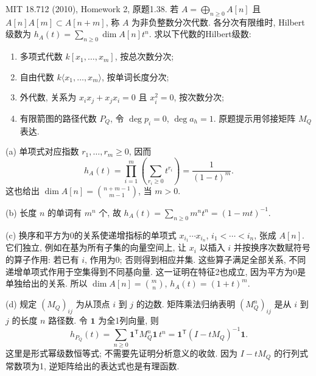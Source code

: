 \begin{exercise}\label{hw:1.38}
MIT 18.712 (2010), Homework 2, 原题1.38. 若 $A=\bigoplus_{n\ge0}A[n]$ 且 $A[n]A[m]\subset A[n+m]$, 称 $A$ 为非负整数分次代数. 各分次有限维时, Hilbert级数为 $h_A(t)=\sum_{n\ge0}\dim A[n]t^n$. 求以下代数的Hilbert级数:
\begin{enumerate}[label=(\alph*)]
\item 多项式代数 $k[x_1,\ldots,x_m]$, 按总次数分次;
\item 自由代数 $k\langle x_1,\ldots,x_m\rangle$, 按单词长度分次;
\item 外代数, 关系为 $x_ix_j+x_jx_i=0$ 且 $x_i^2=0$, 按次数分次;
\item 有限箭图的路径代数 $P_Q$, 令 $\deg p_i=0$, $\deg a_h=1$. 原题提示用邻接矩阵 $M_Q$ 表达.
\end{enumerate}
\end{exercise}
\begin{solution}
(a) 单项式对应指数 $r_1,\ldots,r_m\ge0$, 因而
\[
h_A(t)=\prod_{i=1}^m\left(\sum_{r_i\ge0}t^{r_i}\right)=\frac1{(1-t)^m}.
\]
这也给出 $\dim A[n]=\binom{n+m-1}{m-1}$, 当 $m>0$.

(b) 长度 $n$ 的单词有 $m^n$ 个, 故 $h_A(t)=\sum_{n\ge0}m^nt^n=(1-mt)^{-1}$.

(c) 换序和平方为0的关系使递增指标的单项式 $x_{i_1}\cdots x_{i_n}$, $i_1<\cdots<i_n$, 张成 $A[n]$. 它们独立, 例如在基为所有子集的向量空间上, 让 $x_i$ 以插入 $i$ 并按换序次数赋符号的算子作用: 若已有 $i$, 作用为0; 否则得到相应并集. 这些算子满足全部关系, 不同递增单项式作用于空集得到不同基向量. 这一证明在特征2也成立, 因为平方为0是单独给出的关系. 所以 $\dim A[n]=\binom mn$, $h_A(t)=(1+t)^m$.

(d) 规定 $(M_Q)_{ij}$ 为从顶点 $i$ 到 $j$ 的边数. 矩阵乘法归纳表明 $(M_Q^n)_{ij}$ 是从 $i$ 到 $j$ 的长度 $n$ 路径数. 令 $\mathbf1$ 为全1列向量, 则
\[
h_{P_Q}(t)=\sum_{n\ge0}\mathbf1^{\mathsf T}M_Q^n\mathbf1\,t^n
=\mathbf1^{\mathsf T}(I-tM_Q)^{-1}\mathbf1.
\]
这里是形式幂级数恒等式; 不需要先证明分析意义的收敛. 因为 $I-tM_Q$ 的行列式常数项为1, 逆矩阵给出的表达式也是有理函数.
\end{solution}

